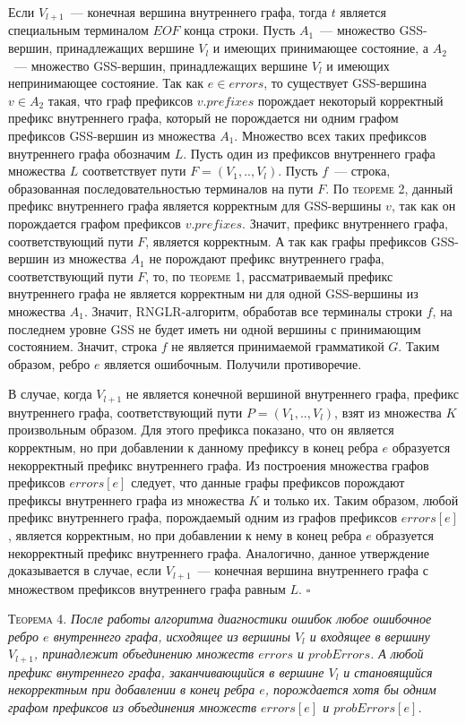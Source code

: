 Если $V_{l+1}$~--- конечная вершина внутреннего графа, тогда $t$ является специальным терминалом $EOF$ конца строки. Пусть $A_{1}$~--- множество GSS-вершин, принадлежащих вершине $V_{l}$ и имеющих принимающее состояние, а $A_{2}$~--- множество GSS-вершин, принадлежащих вершине $V_{l}$ и имеющих непринимающее состояние. Так как $e \in errors$, то существует GSS-вершина $v \in A_{2}$ такая, что граф префиксов $v.prefixes$ порождает некоторый корректный префикс внутреннего графа, который не порождается ни одним графом префиксов GSS-вершин из множества $A_{1}$. Множество всех таких префиксов внутреннего графа обозначим $L$. Пусть один из префиксов внутреннего графа множества $L$ соответствует пути $F = (V_{1},..,V_{l})$. Пусть $f$~--- строка, образованная последовательностью терминалов на пути $F$. По \textsc{теореме 2}, данный префикс внутреннего графа является корректным для GSS-вершины $v$, так как он порождается графом префиксов $v.prefixes$. Значит, префикс внутреннего графа, соответствующий пути $F$, является корректным. А так как графы префиксов GSS-вершин из множества $A_{1}$ не порождают префикс внутреннего графа, соответствующий пути $F$, то, по \textsc{теореме 1}, рассматриваемый префикс внутреннего графа не является корректным ни для одной GSS-вершины из множества $A_{1}$. Значит, RNGLR-алгоритм, обработав все терминалы строки $f$, на последнем уровне GSS не будет иметь ни одной вершины с принимающим состоянием. Значит, строка $f$ не является принимаемой грамматикой $G$. Таким образом, ребро $e$ является ошибочным. Получили противоречие.

В случае, когда $V_{l+1}$ не является конечной вершиной внутреннего графа, префикс внутреннего графа, соответствующий пути $P = (V_{1},..,V_{l})$, взят из множества $K$ произвольным образом. Для этого префикса показано, что он является корректным, но при добавлении к данному префиксу в конец ребра $e$ образуется некорректный префикс внутреннего графа. Из построения множества графов префиксов $errors[e]$ следует, что данные графы префиксов порождают префиксы внутреннего графа из множества $K$ и только их. Таким образом, любой префикс внутреннего графа, порождаемый одним из графов префиксов $errors[e]$, является корректным, но при добавлении к нему в конец ребра $e$ образуется некорректный префикс внутреннего графа. Аналогично, данное утверждение доказывается в случае, если $V_{l+1}$~--- конечная вершина внутреннего графа с множеством префиксов внутреннего графа равным $L$.
$\square$

\textsc{Теорема 4.}
\textit{После работы алгоритма диагностики ошибок любое ошибочное ребро $e$ внутреннего графа, исходящее из вершины $V_{l}$ и входящее в вершину $V_{l+1}$, принадлежит объединению множеств $errors$ и $probErrors$. А любой префикс внутреннего графа, заканчивающийся в вершине $V_{l}$ и становящийся некорректным при добавлении в конец ребра $e$, порождается хотя бы одним графом префиксов из объединения множеств $errors[e]$ и $probErrors[e]$.}

